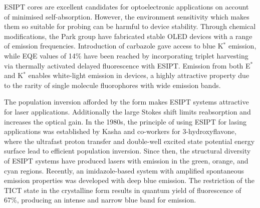 \ac{ESIPT} cores are excellent candidates for optoelectronic applications on account of minimised self-absorption. However, the environment sensitivity which makes them so suitable for probing can be harmful to device stability.\cite{Kwon2011} Through chemical modifications, the Park group have fabricated stable \ac{OLED} devices with a range of emission frequencies.\cite{Park2008,Park2009,Kim2011} Introduction of carbazole gave access to blue K$^*$ emission, while \ac{EQE} values of 14\% have been reached by incorporating triplet harvesting via thermally activated delayed fluorescence with \ac{ESIPT}.\cite{Park2008,Mamada2017} Emission from both E$^*$ and K$^*$ enables white-light emission in devices, a highly attractive property due to the rarity of single molecule fluorophores with wide emission bands.\cite{Tang2011,Yao2011,Zhang2016b,Serdiuk2017}

The population inversion afforded by the \Kstar form makes \ac{ESIPT} systems attractive for laser applications.\cite{Fang2014,Gierschner2016} Additionally the large Stokes shift limits reabsorption and increases the optical gain.\cite{Kwon2011} In the 1980s, the principle of using \ac{ESIPT} for lasing applications was established by Kasha and co-workers for 3-hydroxyflavone, where the ultrafast proton transfer and double-well excited state potential energy surface lead to efficient population inversion.\cite{Khan1983,Chou1984} Since then, the structural diversity of \ac{ESIPT} systems have produced lasers with emission in the green, orange, and cyan regions.\cite{Sakai2016,Chen2016,Park2012,Park2008} Recently, an imidazole-based system with amplified spontaneous emission properties was developed with deep blue emission.\cite{Park2017} The restriction of the \ac{TICT} state in the crystalline form results in quantum yield of fluorescence of 67\%, producing an intense and narrow blue band for emission. 
